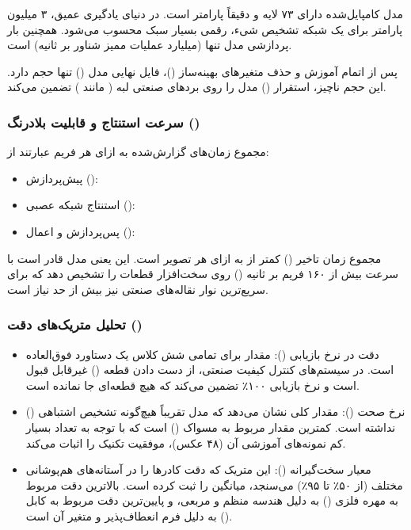 \documentclass{article}
\begin{document}
 مدل کامپایل‌شده دارای ۷۳ لایه و دقیقاً  پارامتر است. در دنیای یادگیری عمیق، ۳ میلیون پارامتر برای یک شبکه تشخیص شیء، رقمی بسیار سبک محسوب می‌شود. همچنین بار پردازشی مدل تنها  (میلیارد عملیات ممیز شناور بر ثانیه) است.
 
  پس از اتمام آموزش و حذف متغیرهای بهینه‌ساز ()، فایل نهایی مدل () تنها  حجم دارد. این حجم ناچیز، استقرار () مدل را روی بردهای صنعتی لبه ( مانند ) تضمین می‌کند.


\subsubsection{سرعت استنتاج و قابلیت بلادرنگ ()}

مجموع زمان‌های گزارش‌شده به ازای هر فریم عبارتند از:
\begin{itemize}
	\item پیش‌پردازش (): 
	\item استنتاج شبکه عصبی (): 
	\item پس‌پردازش و اعمال  (): 
\end{itemize}

مجموع زمان تاخیر () کمتر از  به ازای هر تصویر است. این یعنی مدل قادر است با سرعت بیش از ۱۶۰ فریم بر ثانیه () روی سخت‌افزار  قطعات را تشخیص دهد که برای سریع‌ترین نوار نقاله‌های صنعتی نیز بیش از حد نیاز است.

\subsubsection{تحلیل متریک‌های دقت ()}

\begin{itemize}
	\item دقت در نرخ بازیابی (): مقدار  برای تمامی شش کلاس یک دستاورد فوق‌العاده است. در سیستم‌های کنترل کیفیت صنعتی، از دست دادن قطعه () غیرقابل قبول است و نرخ بازیابی ۱۰۰٪ تضمین می‌کند که هیچ قطعه‌ای جا نمانده است.
	\item نرخ صحت (): مقدار کلی  نشان می‌دهد که مدل تقریباً هیچ‌گونه تشخیص اشتباهی () نداشته است. کمترین مقدار مربوط به مسواک () است که با توجه به تعداد بسیار کم نمونه‌های آموزشی آن (۴۸ عکس)، موفقیت تکنیک  را اثبات می‌کند.
	\item معیار سخت‌گیرانه (): این متریک که دقت کادرها را در آستانه‌های هم‌پوشانی مختلف (از ۵۰٪ تا ۹۵٪) می‌سنجد، میانگین  را ثبت کرده است. بالاترین دقت مربوط به مهره فلزی () به دلیل هندسه منظم و مربعی، و پایین‌ترین دقت مربوط به کابل () به دلیل فرم انعطاف‌پذیر و متغیر آن است.
\end{itemize}
\end{document}
